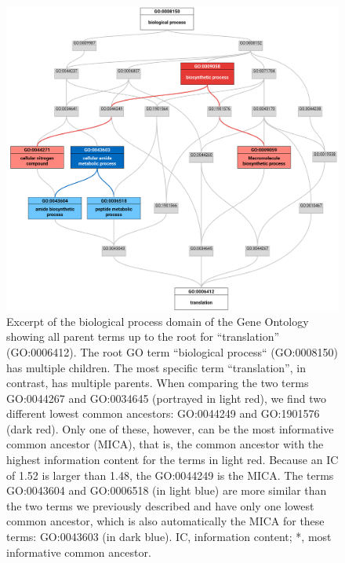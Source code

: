 \begin{figure}
\centering
\includegraphics{resources/figures/chapter4_megago_biological_process_excerpt.png}
\caption{Excerpt of the biological process domain of the Gene Ontology
showing all parent terms up to the root for ``translation''
(GO:0006412). The root GO term ``biological process`` (GO:0008150) has
multiple children. The most specific term ``translation'', in contrast,
has multiple parents. When comparing the two terms GO:0044267 and
GO:0034645 (portrayed in light red), we find two different lowest common
ancestors: GO:0044249 and GO:1901576 (dark red). Only one of these,
however, can be the most informative common ancestor (MICA), that is,
the common ancestor with the highest information content for the terms
in light red. Because an IC of 1.52 is larger than 1.48, the GO:0044249
is the MICA. The terms GO:0043604 and GO:0006518 (in light blue) are
more similar than the two terms we previously described and have only
one lowest common ancestor, which is also automatically the MICA for
these terms: GO:0043603 (in dark blue). IC, information content; *, most
informative common
ancestor.\label{fig:megago_biological_process_excerpt}}
\end{figure}

